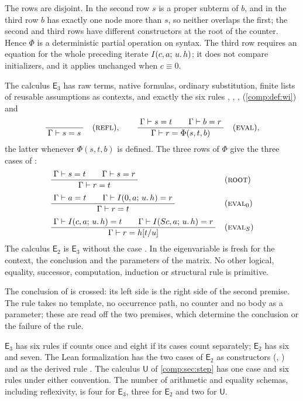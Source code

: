 The rows are disjoint. In the second row $s$ is a proper subterm of $b$, and
in the third row $b$ has exactly one node more than $s$, so neither overlaps
the first; the second and third rows have different constructors at the root
of the counter. Hence $\Phi$ is a deterministic partial operation on syntax.
The third row requires an equation for the whole preceding iterate
$I(c,a;\,u.\,h)$; it does not compare initializers, and it applies
unchanged when $c\equiv0$.

\begin{definition}
\label{comp:def:e3}
The calculus $\mathsf{E}_3$ has raw terms, native formulas, ordinary
substitution, finite lists of reusable assumptions as contexts, and exactly
the six rules , , , 
(\cref{comp:def:wi}) and
\[
 \infrule{}{\Gamma\proves s=s}\quad\text{(\rulename{Refl})},
 \qquad
 \infrule{\Gamma\proves s=t\qquad\Gamma\proves b=r}
         {\Gamma\proves r=\Phi(s,t,b)}\quad\text{(\rulename{Eval})},
\]
the latter whenever $\Phi(s,t,b)$ is defined. The three rows of $\Phi$ give
the three cases of :
\begin{align*}
 &\infrule{\Gamma\proves s=t\qquad\Gamma\proves s=r}{\Gamma\proves r=t}
   &&\text{(\rulename{Root})}\\[4pt]
 &\infrule{\Gamma\proves a=t\qquad\Gamma\proves\It{0}{a}{u}{h}=r}
          {\Gamma\proves r=t}
   &&\text{(\rulename{Eval}$_0$)}\\[4pt]
 &\infrule{\Gamma\proves\It{c}{a}{u}{h}=t\qquad
           \Gamma\proves\It{\Suc c}{a}{u}{h}=r}
          {\Gamma\proves r=h\subst{t}{u}}
   &&\text{(\rulename{Eval}$_{\Suc}$)}
\end{align*}
The calculus $\mathsf{E}_2$ is $\mathsf{E}_3$ without the case
. In  the eigenvariable is fresh for the
context, the conclusion and the parameters of the matrix. No other logical,
equality, successor, computation, induction or structural rule is primitive.
\end{definition}

The conclusion of  is crossed: its left side is the right
side of the second premise. The rule takes no template, no occurrence path,
no counter and no body as a parameter; these are read off the two premises,
which determine the conclusion or the failure of the rule.

\begin{remark}[Counting]
\label{comp:rem:counting}
$\mathsf{E}_3$ has six rules if  counts once and eight if its
cases count separately; $\mathsf{E}_2$ has six and seven. The Lean
formalization  has the two cases of $\mathsf{E}_2$ as
constructors (, ) and  as the
derived rule . The calculus $\mathsf{U}$ of
\cref{comp:sec:step} has one case and six rules under either convention. The
number of arithmetic and equality schemas, including reflexivity, is four
for $\mathsf{E}_3$, three for $\mathsf{E}_2$ and two for $\mathsf{U}$.
\end{remark}

